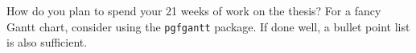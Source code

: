 How do you plan to spend your 21 weeks of work on the thesis?
For a fancy Gantt chart, consider using the \verb+pgfgantt+ package.
If done well, a bullet point list is also sufficient.
